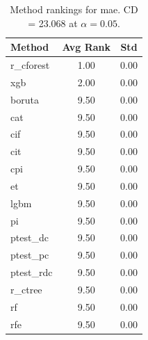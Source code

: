 \begin{table}[h]
\centering
\caption{Method rankings for mae. CD = 23.068 at $\alpha=0.05$.}
\label{tab:ranks_mae}
\begin{tabular}{lcc}
\toprule
Method & Avg Rank & Std \\
\midrule
r_cforest & 1.00 & 0.00 \\
xgb & 2.00 & 0.00 \\
boruta & 9.50 & 0.00 \\
cat & 9.50 & 0.00 \\
cif & 9.50 & 0.00 \\
cit & 9.50 & 0.00 \\
cpi & 9.50 & 0.00 \\
et & 9.50 & 0.00 \\
lgbm & 9.50 & 0.00 \\
pi & 9.50 & 0.00 \\
ptest_dc & 9.50 & 0.00 \\
ptest_pc & 9.50 & 0.00 \\
ptest_rdc & 9.50 & 0.00 \\
r_ctree & 9.50 & 0.00 \\
rf & 9.50 & 0.00 \\
rfe & 9.50 & 0.00 \\
\bottomrule
\end{tabular}
\end{table}